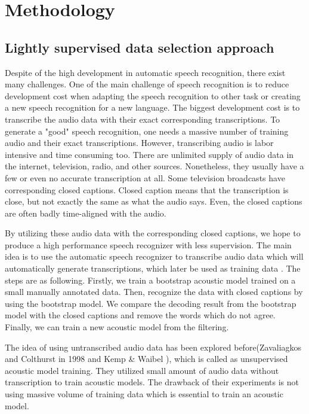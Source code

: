 \chapter{Methodology}


\section{Lightly supervised data selection approach}
\label{lsselection}
Despite of the high development in automatic speech recognition, there exist many challenges. One of the main challenge of speech recognition is to reduce development cost when adapting the speech recognition to other task or creating a new speech recognition for a new language. The biggest development cost is to transcribe the audio data with their exact corresponding transcriptions. To generate a "good" speech recognition, one needs a massive number of training audio and their exact transcriptions. However, transcribing audio is labor intensive and time consuming too. There are unlimited supply of audio data in the internet, television, radio, and other sources. Nonetheless, they usually have a few or even no accurate transcription at all.  Some television broadcasts have corresponding closed captions.  Closed caption means that the transcription is close, but not exactly the same as what the audio says. Even, the closed captions are often badly time-aligned with the audio.

By utilizing these audio data with the corresponding closed captions, we hope to produce a high performance speech recognizer with less supervision. The main idea is to use the automatic speech recognizer to transcribe audio data which will automatically generate transcriptions, which later be used as training data \cite{lightlySupervised}. The steps are as following. Firstly, we train a bootstrap acoustic model trained on a small manually annotated data. Then, recognize the data with closed captions by using the bootstrap model. We compare the decoding result from the bootstrap model with the closed captions and remove the words which do not agree. Finally, we can train a new acoustic model from the filtering.

The idea of using untranscribed audio data has been explored before(Zavaliagkos and Colthurst in 1998 \cite{Zavaliagkos1998UtilizingUT} and Kemp \& Waibel \cite{Kemp_unsupervisedtraining}), which is called as unsupervised acoustic model training. They utilized small amount of audio data without transcription to train acoustic models. The drawback of their experiments is not using massive volume of training data which is essential to train an acoustic model.

